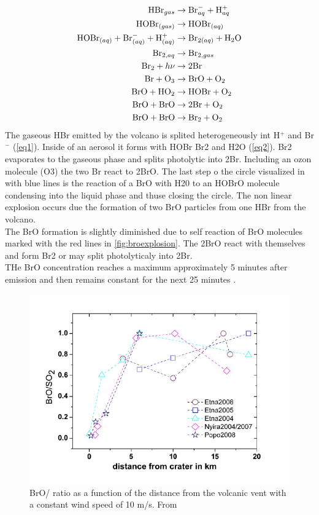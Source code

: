 \documentclass  [
  paper    = a4,
  BCOR     = 10mm,
  twoside,
  fontsize = 12pt,
  fleqn,
  toc      = bibnumbered,
  toc      = listofnumbered,
  numbers  = noendperiod,
  headings = normal,
  listof   = leveldown,
  version  = 3.03
]                                       {scrreprt}
\begin{document}
\begin{align}
\ce{HBr}_{gas} &\rightarrow \ce{Br}^{-}_{aq} + \ce{H}^{+}_{aq} \label{eq1}\\
\ce{HOBr}_{(gas)} &\rightarrow \ce{HOBr}_{(aq)} \\
\ce{HOBr}_{(aq)} + \ce{Br}^{-}_{(aq)} + \ce{H}^{+}_{(aq)} &\rightarrow
\ce{Br}_{2(aq)} +  \ce{H2O}\label{eq2}\\
\ce{Br}_{2,aq} &\rightarrow \ce{Br}_{2,gas} \\
\ce{Br2} + h\nu &\rightarrow 2 \ce{Br} \\
\ce{Br} + \ce{O3} &\rightarrow \ce{BrO} + \ce{O2} \\
\ce{BrO} + \ce{HO2} &\rightarrow \ce{HOBr} + \ce{O2} \\
\ce{BrO} + \ce{BrO} &\rightarrow 2 \ce{Br} + \ce{O2} \\
\ce{BrO} + \ce{BrO} &\rightarrow \ce{Br2} + \ce{O2}
\end{align}
The gaseous HBr emitted by the volcano is splited heterogeneously int H$^{+}$ and Br$^{-}$ (\cref{eq1}). Inside of an aerosol it forms with HOBr Br2 and H2O (\cref{eq2}). Br2 evaporates to the gaseous phase and splits photolytic  into 2Br. Including an ozon molecule (O3) the two Br react to 2BrO. The last step o the circle visualized in  with blue lines is the reaction of a BrO with H20 to an HOBrO molecule condensing into the liquid phase  and thuse closing the circle. The non linear explosion occurs due the formation of two BrO particles from one HBr from the volcano.\\
The BrO formation is slightly diminished due to self reaction of BrO molecules marked with the red lines in \cref{fig:broexplosion}. The 2BrO react with themselves and form Br2 or may split photolyticaly into 2Br.\\
THe BrO concentration reaches a maximum approximately 5 minutes after emission and then remains constant for the next 25 minutes \citet{lubcke2014bro}.
 \begin{figure}
 	\centering
 	\includegraphics[width=0.7\linewidth]{Bilder/rat_diff}
 	\caption{BrO/ ratio as a function of the distance from the volcanic vent with a constant wind speed of 10 m/s. From \cite{lubcke2014optical}}
 	\label{fig:ratdiff}
 \end{figure}
 
\end{document}
